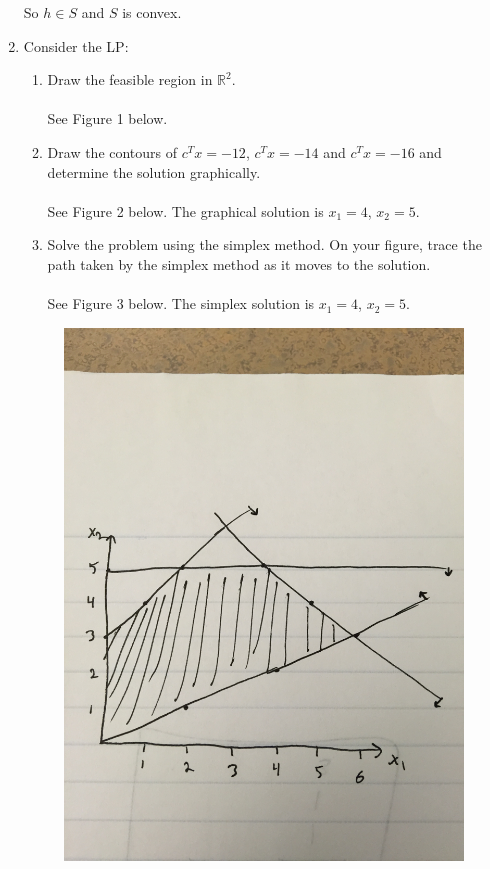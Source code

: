 \documentclass[12pt]{article}
\begin{document}
\begin{enumerate}
    So $h\in S$ and $S$ is convex.
  \item Consider the LP:
  \begin{enumerate}
    \item Draw the feasible region in $\mathbb{R}^2$.\\\\
    See Figure 1 below.
    \item Draw the contours of $c^Tx = -12$, $c^Tx = -14$ and $c^Tx = -16$
      and determine the solution graphically.\\\\
    See Figure 2 below. The graphical solution is $x_1 = 4$, $x_2 = 5$.
    \item Solve the problem using the simplex method. On your figure, trace
      the path taken by the simplex method as it moves to the solution.\\\\
      See Figure 3 below. The simplex solution is $x_1 = 4$, $x_2 = 5$.
  \end{enumerate}
  \begin{figure}
    \includegraphics[width=\linewidth,angle=-90]{feasible_region.jpg}

\end{figure}
\end{enumerate}
\end{document}
